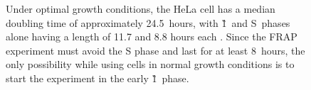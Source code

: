       \begin{figure}
        \centering
        \newcommand{\slice}[4]{
          \pgfmathparse{0.5*#1+0.5*#2}
          \let\midangle\pgfmathresult

          \draw[thick,fill=black!10] (0,0) -- (#1:1) arc (#1:#2:1) -- cycle;

          \node[label=\midangle:#4] at (\midangle:1) {};

          \pgfmathparse{min((#2-#1-10)/110*(-0.3),0)}
          \let\temp\pgfmathresult
          \pgfmathparse{max(\temp,-0.5) + 0.8}
          \let\innerpos\pgfmathresult
          \node at (\midangle:\innerpos) {#3};
        }
          {
            Under optimal growth conditions, the HeLa cell has a median
            doubling time of approximately 24.5~hours, with \G1~and
            S~phases alone having a length of 11.7 and 8.8 hours each \citep{HeLaCellCycle}.
            Since the FRAP experiment must avoid the S phase and last for
            at least 8~hours, the only possibility while using cells in normal
            growth conditions is to start the experiment in the early \G1~phase.
          }
        \label{fig:kill-frap:cell-cycle}
      \end{figure}


